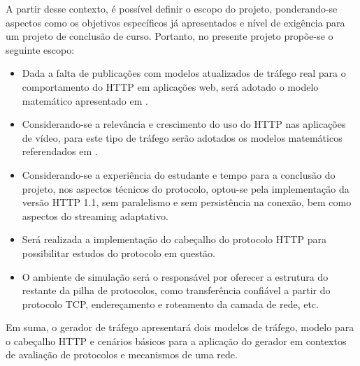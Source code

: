 A partir desse contexto, é possível definir o escopo do projeto, ponderando-se aspectos como os objetivos específicos já apresentados e nível de exigência para um projeto de conclusão de curso. Portanto, no presente projeto propõe-se o seguinte escopo:

\begin{itemize}
	\item Dada a falta de publicações com modelos atualizados de tráfego real para o comportamento do HTTP em aplicações web, será adotado o modelo matemático apresentado em \cite{Pries2012}.
	\item Considerando-se a relevância e crescimento do uso do HTTP nas aplicações de vídeo, para este tipo de tráfego serão adotados os modelos matemáticos referendados em \cite{Navarro-Ortiz2020}.
	\item Considerando-se a experiência do estudante e tempo para a conclusão do projeto, nos aspectos técnicos do protocolo, optou-se pela implementação da versão HTTP 1.1, sem paralelismo e sem persistência na conexão, bem como aspectos do streaming adaptativo.
	\item Será realizada a implementação do cabeçalho do protocolo HTTP para possibilitar estudos do protocolo em questão.
	\item O ambiente de simulação será o responsável por oferecer a estrutura do restante da pilha de protocolos, como transferência confiável a partir do protocolo TCP, endereçamento e roteamento da camada de rede, etc. 
\end{itemize}

Em suma, o gerador de tráfego apresentará dois modelos de tráfego, modelo para o cabeçalho HTTP e cenários básicos para a aplicação do gerador em contextos de avaliação de protocolos e mecanismos de uma rede.

